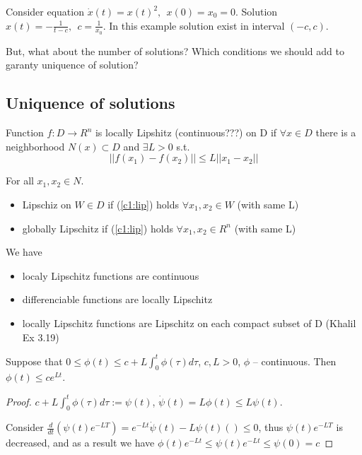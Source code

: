 \begin{Example}
Consider equation $\dot x(t) = x(t)^2, \ \ x(0)=x_0=0$. Solution 
$x(t)=-\frac{1}{t-c}, \ \ c=\frac{1}{x_0}$. In this example
solution exist in interval $(-c, c)$.
\end{Example}


But, what about the number of solutions? Which conditions we should
add to garanty uniquence of solution?


\subsection{Uniquence of solutions}

\begin{Definition}
Function $f:D \rightarrow R^n$ is locally Lipshitz (continuous???) on D
if $\forall x \in D$ there is a neighborhood $N(x) \subset D$ and
$\exists L > 0$ s.t. 
\begin{equation}\label{c1:lip}
||f(x_1)-f(x_2)|| \le L ||x_1 - x_2|| 
\end{equation}

For all $x_1,x_2 \in N$.
\end{Definition}

\begin{itemize}
\item Lipschiz on $W \in D$ if (\ref{c1:lip}) holds $\forall x_1,x_2 \in W$ 
(with same L)
\item globally Lipschitz if (\ref{c1:lip}) holds $\forall x_1, x_2 \in R^n$
(with same L)
\end{itemize}


We have
\begin{itemize}[label=$\#$]
 \item localy Lipschitz functions are continuous
 \item differenciable functions are locally Lipschitz
 \item locally Lipschitz functions are Lipschitz on each compact subset of D
 	(Khalil Ex 3.19)
\end{itemize}

\begin{Lemma}[Cromwall]
Suppose that $0 \le \phi(t) \le c + L \int^t_0 \phi(\tau) d \tau$, $c,L > 0$, $\phi$ -- 
continuous. Then $\phi(t) \le c e^{Lt}$.
\begin{proof}
$c + L\int^t_0 \phi(\tau) d \tau := \psi(t)$, $\dot \psi(t) = L\phi(t) \le L \psi (t)$.

Consider $\frac{d}{dt} \left(\psi(t) e^{-LT}\right) = e^{-Lt}
\dot \psi(t)-L \psi(t) \left(\right) \le 0$, thus $\psi(t) e^{-LT}$ is
decreased, and as a result we have $\phi(t)e^{-Lt}\le \psi(t)e^{-Lt}\le \psi(0)=c$ 

\end{proof}
\end{Lemma}


